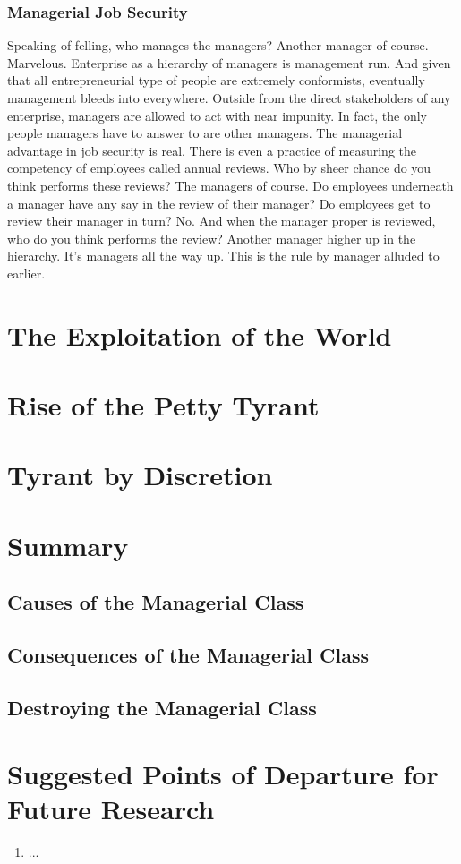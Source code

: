 \documentclass[12pt]{article}
\begin{document}
\subsubsection{Managerial Job Security}
Speaking of felling, who manages the managers?
Another manager of course.
Marvelous.
Enterprise as a hierarchy of managers is management run.
And given that all entrepreneurial type of people are extremely conformists, eventually management bleeds into everywhere.
Outside from the direct stakeholders of any enterprise, managers are allowed to act with near impunity.
In fact, the only people managers have to answer to are other managers.
The managerial advantage in job security is real.
There is even a practice of measuring the competency of employees called annual reviews.
Who by sheer chance do you think performs these reviews?
The managers of course.
Do employees underneath a manager have any say in the review of their manager?
Do employees get to review their manager in turn?
No.
And when the manager proper is reviewed, who do you think performs the review?
Another manager higher up in the hierarchy.
It's managers all the way up.
This is the rule by manager alluded to earlier.

\section{The Exploitation of the World}
\section{Rise of the Petty Tyrant}
\section{Tyrant by Discretion}

\section{Summary}
\subsection{Causes of the Managerial Class}
\subsection{Consequences of the Managerial Class}
\subsection{Destroying the Managerial Class}

\section{Suggested Points of Departure for Future Research}


\begin{enumerate}
    \item ...
\end{enumerate}
\end{document}
